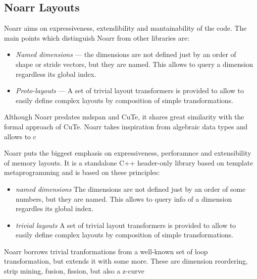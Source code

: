 
\subsection{Noarr Layouts}

Noarr aims on expressiveness, extendibility and mantainability of the code. The main points which distinguish Noarr from other libraries are:

\begin{itemize}
  \item \emph{Named dimensions} --- the dimensions are not defined just by an order of shape or stride vectors, but they are named. This allows to query a dimension regardless its global index.
  \item \emph{Proto-layouts} --- A set of trivial layout transformers is provided to allow to easily define complex layouts by composition of simple transformations.
\end{itemize}

Although Noarr predates mdspan and CuTe, it shares great similarity with the formal approach of CuTe. Noarr takes inspiration from algebraic data types and allows to c

Noarr puts the biggest emphasis on expressiveness, perforamnce and extensibility of memory layouts. It is a standalone C++ header-only library based on template metaprogramming and is based on these principles:
\begin{itemize}
  \item \emph{named dimensions} The dimensions are not defined just by an order of some numbers, but they are named. This allows to query info of a dimension regardles its global index.
  \item \emph{trivial layouts} A set of trivial layout transformers is provided to allow to easily define complex layouts by composition of simple transformations.
\end{itemize}

Noarr borrows trivial tranformations from a well-known set of loop transformation, but extends it with some more. These are dimension reordering, 
strip mining, fusion, fission, but also a z-curve

